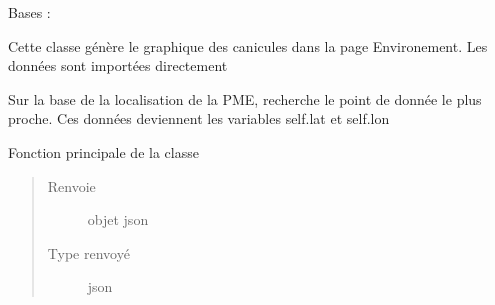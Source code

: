 \documentclass[letterpaper,10pt,french]{sphinxmanual}
\begin{document}

\begin{fulllineitems}
\label{\detokenize{app.home.content_gen:app.home.content_gen.graph_generation.CaniculePlot}}
\sphinxAtStartPar
Bases : 

\sphinxAtStartPar
Cette classe génère le graphique des canicules dans la page Environement.
Les données sont importées directement

\begin{fulllineitems}
\label{\detokenize{app.home.content_gen:app.home.content_gen.graph_generation.CaniculePlot.find_closest}}
\sphinxAtStartPar
Sur la base de la localisation de la PME, recherche le point de donnée le plus proche.
Ces données deviennent les variables self.lat et self.lon

\end{fulllineitems}


\begin{fulllineitems}
\label{\detokenize{app.home.content_gen:app.home.content_gen.graph_generation.CaniculePlot.main}}
\sphinxAtStartPar
Fonction principale de la classe
\begin{quote}\begin{description}
\item[{Renvoie}] \leavevmode
\sphinxAtStartPar
objet json

\item[{Type renvoyé}] \leavevmode
\sphinxAtStartPar
json

\end{description}\end{quote}

\end{fulllineitems}


\end{fulllineitems}
\end{document}
